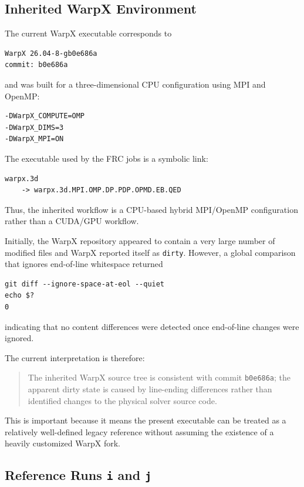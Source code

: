 \documentclass[11pt,a4paper]{article}
\begin{document}
\subsection{Inherited WarpX Environment}

The current WarpX executable corresponds to

\begin{lstlisting}
WarpX 26.04-8-gb0e686a
commit: b0e686a
\end{lstlisting}

and was built for a three-dimensional CPU configuration using MPI and OpenMP:

\begin{lstlisting}
-DWarpX_COMPUTE=OMP
-DWarpX_DIMS=3
-DWarpX_MPI=ON
\end{lstlisting}

The executable used by the FRC jobs is a symbolic link:

\begin{lstlisting}
warpx.3d
    -> warpx.3d.MPI.OMP.DP.PDP.OPMD.EB.QED
\end{lstlisting}

Thus, the inherited workflow is a CPU-based hybrid MPI/OpenMP configuration rather than a CUDA/GPU workflow.

Initially, the WarpX repository appeared to contain a very large number of modified files and WarpX reported itself as \texttt{dirty}. However, a global comparison that ignores end-of-line whitespace returned

\begin{lstlisting}
git diff --ignore-space-at-eol --quiet
echo $?
0
\end{lstlisting}

indicating that no content differences were detected once end-of-line changes were ignored.

The current interpretation is therefore:

\begin{quote}
The inherited WarpX source tree is consistent with commit \texttt{b0e686a}; the apparent dirty state is caused by line-ending differences rather than identified changes to the physical solver source code.
\end{quote}

This is important because it means the present executable can be treated as a relatively well-defined legacy reference without assuming the existence of a heavily customized WarpX fork.

\subsection{Reference Runs \texttt{i} and \texttt{j}}
\end{document}
